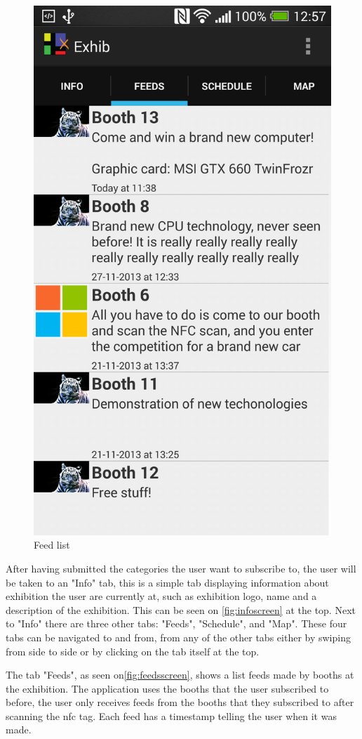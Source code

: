 \begin{figure}[H]
\begin{minipage}[b]{0.5\columnwidth}
\includegraphics[width=0.7\columnwidth]{img/finaldesign/feedsscreen.png}
\caption{Feed list} 
\label{fig:feedsscreen}
\end{minipage}
\end{figure}

After having submitted the categories the user want to subscribe to, the user will be taken to an "Info" tab, this is a simple tab displaying information about exhibition the user are currently at, such as exhibition logo, name and a description of the exhibition. This can be seen on \autoref{fig:infoscreen}  at the top. Next to "Info" there are three other tabs: "Feeds", "Schedule", and "Map". These four tabs can be navigated to and from, from any of the other tabs either by swiping from side to side or by clicking on the tab itself at the top.

The tab "Feeds", as seen on\autoref{fig:feedsscreen}, shows a list feeds made by booths at the exhibition. The application uses the booths that the user subscribed to before, the user only receives feeds from the booths that they subscribed to after scanning the \ac{nfc} tag. Each feed has a timestamp telling the user when it was made.

